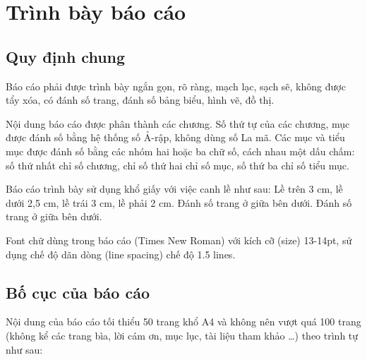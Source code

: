 \chapter{Trình bày báo cáo}
\label{Chapter2}

\section{Quy định chung}

Báo cáo phải được trình bày ngắn gọn, rõ ràng, mạch lạc, sạch sẽ, không được tẩy xóa, có đánh số trang, đánh số bảng biểu, hình vẽ, đồ thị. 

Nội dung báo cáo được phân thành các chương. Số thứ tự của các chương, mục được đánh số bằng hệ thống số Ả-rập, không dùng số La mã. Các mục và tiểu mục được đánh số bằng các nhóm hai hoặc ba chữ số, cách nhau một dấu chấm: số thứ nhất chỉ số chương, chỉ số thứ hai chỉ số mục, số thứ ba chỉ số tiểu mục.



 Báo cáo trình bày sử dụng khổ giấy với việc canh lề như sau: Lề trên 3 cm, lề dưới 2,5 cm, lề trái 3 cm, lề phải 2 cm. Đánh số trang ở giữa bên dưới. Đánh số trang ở giữa bên dưới.

Font chữ dùng trong báo cáo (Times New Roman) với kích cỡ (size) 13-14pt, sử dụng chế độ dãn dòng (line spacing) chế độ 1.5 lines.



\section{Bố cục của báo cáo}

Nội dung của báo cáo tối thiểu 50 trang khổ A4 và không nên vượt quá 100 trang (không kể các trang bìa, lời cám ơn, mục lục, tài liệu tham khảo \ldots) theo trình tự như sau:

